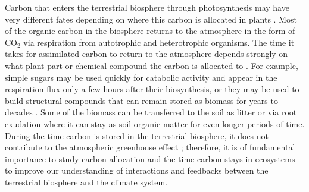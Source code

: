 \documentclass[bg, manuscript]{copernicus}
\begin{document}
\introduction  %
Carbon that enters the terrestrial biosphere through photosynthesis may have very different fates depending on where this carbon is allocated in plants \citep{Trumbore2006}. Most of the organic carbon in the biosphere returns to the atmosphere in the form of CO$_2$ via respiration from autotrophic and heterotrophic organisms. The time it takes for assimilated carbon to return to the atmosphere depends strongly on what plant part or chemical compound the carbon is allocated to \citep{Rasmussen2016, Luo2017, Lu2018, Herrera2020}. For example, simple sugars may be used quickly for catabolic activity and appear in the respiration flux only a few hours after their biosynthesis, or they may be used to build structural compounds that can remain stored as biomass for years to decades \citep{Hartmann2016}. Some of the biomass can be transferred to the soil as litter or via root exudation where it can stay as soil organic matter for even longer periods of time. During the time carbon is stored in the terrestrial biosphere, it does not contribute to the atmospheric greenhouse effect \citep{Neubauer2015,Sierra2021BGS}; therefore, it is of fundamental importance to study carbon allocation and the time carbon stays in ecosystems to improve our understanding of interactions and feedbacks between the terrestrial biosphere and the climate system. 
\end{document}
